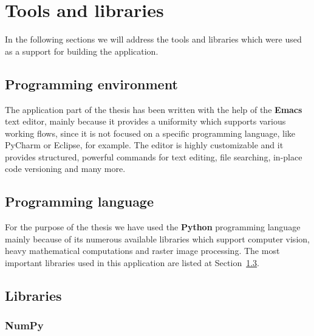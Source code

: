 \documentclass[12pt, a4paper]{report}
\begin{document}
		
	\section{Tools and libraries}
	\label{seq:extras}
	
	In the following sections we will address the tools and libraries which were used as a support for building the application.
	
	\subsection{Programming environment}
	\label{seq:programmingenv}
	
	\par The application part of the thesis has been written with the help of the \textbf{Emacs} text editor, mainly because it provides a uniformity which supports various working flows, since it is not focused on a specific programming language, like PyCharm or Eclipse, for example. The editor is highly customizable and it provides structured, powerful commands for text editing, file searching, in-place code versioning and many more.
	
	\subsection{Programming language}
	\label{seq:programminglang}
	
	\par For the purpose of the thesis we have used the \textbf{Python} programming language mainly because of its numerous available libraries which support computer vision, heavy mathematical computations and raster image processing. The most important libraries used in this application are listed at Section~\ref{seq:libraries}.
	
	\subsection{Libraries}
	\label{seq:libraries}
	
	\subsubsection{NumPy}
	
\end{document}
